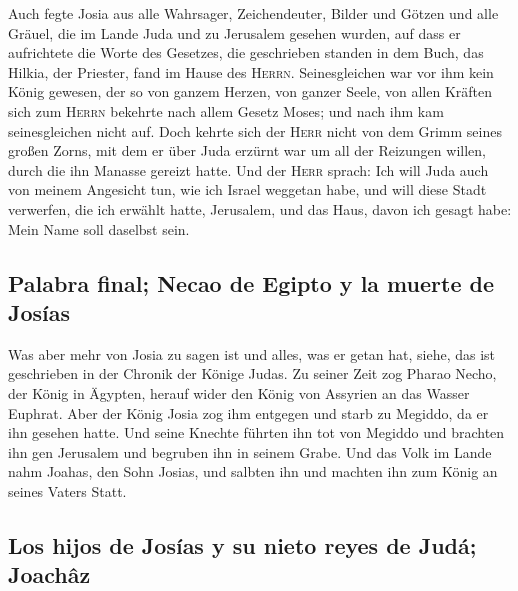  Auch fegte Josia aus alle Wahrsager, Zeichendeuter,
Bilder und Götzen und alle Gräuel, die im Lande Juda und zu Jerusalem
gesehen wurden, auf dass er aufrichtete die Worte des Gesetzes, die
geschrieben standen in dem Buch, das Hilkia, der Priester, fand im Hause
des \textsc{Herrn}.  Seinesgleichen war vor ihm kein
König gewesen, der so von ganzem Herzen, von ganzer Seele, von allen
Kräften sich zum \textsc{Herrn} bekehrte nach allem Gesetz Moses; und
nach ihm kam seinesgleichen nicht auf.  Doch kehrte sich
der \textsc{Herr} nicht von dem Grimm seines großen Zorns, mit dem er
über Juda erzürnt war um all der Reizungen willen, durch die ihn Manasse
gereizt hatte.  Und der \textsc{Herr} sprach: Ich will
Juda auch von meinem Angesicht tun, wie ich Israel weggetan habe, und
will diese Stadt verwerfen, die ich erwählt hatte, Jerusalem, und das
Haus, davon ich gesagt habe: Mein Name soll daselbst sein.

\hypertarget{palabra-final-necao-de-egipto-y-la-muerte-de-josuxedas}{%
\subsection{Palabra final; Necao de Egipto y la muerte de
Josías}\label{palabra-final-necao-de-egipto-y-la-muerte-de-josuxedas}}

 Was aber mehr von Josia zu sagen ist und alles, was er
getan hat, siehe, das ist geschrieben in der Chronik der Könige Judas.
 Zu seiner Zeit zog Pharao Necho, der König in Ägypten,
herauf wider den König von Assyrien an das Wasser Euphrat. Aber der
König Josia zog ihm entgegen und starb zu Megiddo, da er ihn gesehen
hatte.  Und seine Knechte führten ihn tot von Megiddo und
brachten ihn gen Jerusalem und begruben ihn in seinem Grabe. Und das
Volk im Lande nahm Joahas, den Sohn Josias, und salbten ihn und machten
ihn zum König an seines Vaters Statt.

\hypertarget{los-hijos-de-josuxedas-y-su-nieto-reyes-de-juduxe1-joachuxe2z}{%
\subsection{Los hijos de Josías y su nieto reyes de Judá;
Joachâz}\label{los-hijos-de-josuxedas-y-su-nieto-reyes-de-juduxe1-joachuxe2z}}

